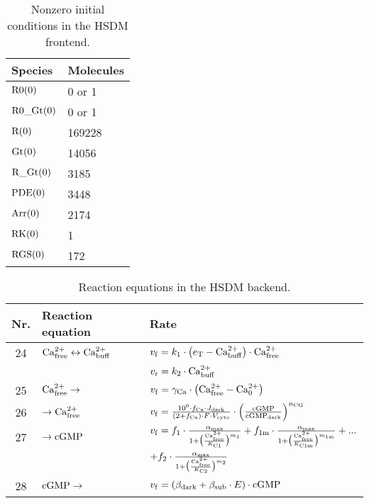 \documentclass[a4paper, 12pt]{book}
\begin{document}
\begin{table}[H]
\centering
\caption{Nonzero initial conditions in the HSDM frontend.}
\begin{tabular}{l | l}
Species & Molecules \\
\hline
\hline
${\rm R0}(0)$ & 0 or 1\\
\hline
${\rm R0}\_{\rm Gt}(0)$ & 0 or 1\\
\hline
${\rm R}(0)$ & 169228\\
\hline
${\rm Gt}(0)$ & 14056\\
\hline
${\rm R}\_{\rm Gt}(0)$ & 3185\\
\hline
${\rm PDE}(0)$ & 3448 \\
\hline
${\rm Arr}(0)$ & 2174\\
\hline
${\rm RK}(0)$ & 1\\
\hline
${\rm RGS}(0)$ & 172\\
\hline
\end{tabular}
\end{table}

\begin{table}[H]
\centering
\caption{Reaction equations in the HSDM backend.}
\label{tab_reacts_mouse}
\begin{tabular}{c | l | l}
Nr. & Reaction equation & Rate \\
\hline
\hline
24 & ${\rm Ca}^{2+}_{\rm free} \leftrightarrow {\rm Ca}^{2+}_{\rm buff}$ & $v_{\rm f} = k_1 \cdot \left( e_{\rm T} - {\rm Ca}^{2+}_{\rm buff} \right) \cdot {\rm Ca}^{2+}_{\rm free} $\\
 & & $v_{\rm r} = k_2 \cdot {\rm Ca}^{2+}_{\rm buff}$\\
\hline
25 & ${\rm Ca}^{2+}_{\rm free} \rightarrow $ & $v_{\rm f} =  \gamma_{\rm Ca} \cdot \left({\rm Ca}^{2+}_{\rm free} - {\rm Ca}^{2+}_{0} \right) $\\
\hline
26 & $ \rightarrow {\rm Ca}^{2+}_{\rm free}$ & $v_{\rm f} = \frac{10^6 \cdot f_{\rm Ca} \cdot J_{\rm dark}}{\left(2+f_{\rm Ca} \right)\cdot F \cdot V_{\rm cyto}} \cdot \left(\frac{{\rm cGMP}}{{\rm cGMP}_{\rm dark}}\right)^{n_{\rm CG}} $\\
\hline
27 & $\rightarrow {\rm cGMP}$ & $v_{\rm f} = f_1 \cdot \frac{\alpha_{\rm max}}{1+\bigl( \frac{{\rm Ca}^{2+}_{\rm free}}{K_{\rm C1}}\bigr)^{m_1}} + f_{\rm 1m} \cdot \frac{\alpha_{\rm max}}{1+\bigl( \frac{{\rm Ca}^{2+}_{\rm free}}{K_{\rm C1m}}\bigr)^{m_{\rm 1m}}} + ...$\\
 & & $ + f_2 \cdot \frac{\alpha_{\rm max}}{1+\bigl( \frac{{\rm Ca}^{2+}_{\rm free}}{K_{\rm C2}}\bigr)^{m_2}}$\\
\hline
28 & ${\rm cGMP} \rightarrow $ & $v_{\rm f} = \left( \beta_{\rm dark} + \beta_{\rm sub} \cdot E \right) \cdot {\rm cGMP} $\\
\hline
\end{tabular}
\end{table}
\end{document}
